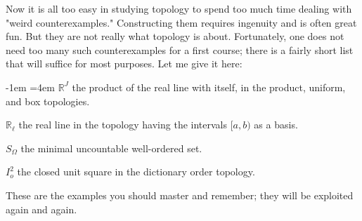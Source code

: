 Now it is all too easy in studying topology to spend too much time dealing with 
"weird counterexamples." Constructing them requires ingenuity and is often great 
fun. But they are not really what topology is about. Fortunately, one does not 
need too many such counterexamples for a first course; there is a fairly short list 
that will suffice for most purposes. Let me give it here:

{\advance\leftskip-1em
\hangindent=4em   %
\({\mathbb{R}}^{J}\) the product of the real line with itself, in the product, uniform, and box topologies.

\({\mathbb{R}}_{\ell }\) the real line in the topology having the intervals \(\lbrack a,b)\) as a basis.

\({S}_{\Omega }\) the minimal uncountable well-ordered set.

\({I}_{o}^{2}\) the closed unit square in the dictionary order topology.
}
These are the examples you should master and remember; they will be exploited again and again.